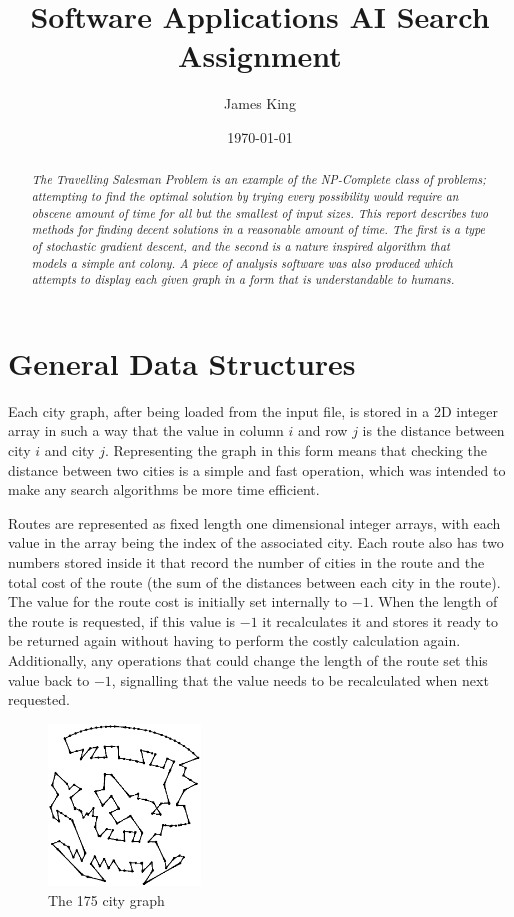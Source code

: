 \documentclass[a4paper,11pt]{article}
\title{Software Applications AI Search Assignment}
\date{\today}
\author{James King}
\begin{document}
\maketitle

\begin{abstract}
\emph{The Travelling Salesman Problem is an example of the NP-Complete class of
problems; attempting to find the optimal solution by trying every possibility
would require an obscene amount of time for all but the smallest of input
sizes. This report describes two methods for finding decent solutions in a 
reasonable amount of time. The first is a type of stochastic gradient descent,
and the second is a nature inspired algorithm that models a simple ant colony.
A piece of analysis software was also produced which attempts to display each
given graph in a form that is understandable to humans.}
\end{abstract}

\section{General Data Structures}
Each city graph, after being loaded from the input file, is stored in a 2D
integer array in such a way that the value in column $i$ and row $j$ is the
distance between city $i$ and city $j$. Representing the graph in this form
means that checking the distance between two cities is a simple and fast
operation, which was intended to make any search algorithms be more time
efficient.

Routes are represented as fixed length one dimensional integer arrays, with
each value in the array being the index of the associated city. Each route also
has two numbers stored inside it that record the number of cities in the route
and the total cost of the route (the sum of the distances between each city in
the route). The value for the route cost is initially set internally to $-1$.
When the length of the route is requested, if this value is $-1$ it
recalculates it and stores it ready to be returned again without having to
perform the costly calculation again. Additionally, any operations that could 
change the length of the route set this value back to $-1$, signalling that the
value needs to be recalculated when next requested.

\begin{figure}
\includegraphics[width=0.36\textwidth]{175vis}
\caption{The 175 city graph}
\end{figure}
\end{document}

